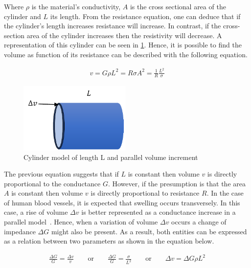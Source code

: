 Where $\rho$ is the material's conductivity, $A$ is the cross sectional area of the cylinder and $L$ its length. From the resistance equation, one can deduce that if the cylinder's length increases resistance will increase. In contrast, if the cross-section area of the cylinder increases then the resistivity will decrease. A representation of this cylinder can be seen in \ref{fig:cylinder model}. Hence, it is possible to find the volume as function of its resistance can be described with the following equation.


\begin{align}
	\label{eq:volume (R)}
	v=G \rho L^2 = R\sigma A^2 = \frac{1}{R} \frac{L^2}{\sigma}
\end{align}

\begin{figure}[!htpb]
	\centering
	\includegraphics[width=5.5cm,keepaspectratio]{figure4}    
	\caption[Cylinder model for impedance calculation]{Cylinder model of length L and parallel volume increment}
	\label{fig:cylinder model}
\end{figure}

The previous equation suggests that if $L$ is constant then volume $v$ is directly proportional to the conductance $G$. However, if the presumption is that the area $A$ is constant then volume $v$ is directly proportional to resistance $R$. In the case of human blood vessels, it is expected that swelling occurs transversely. In this case, a rise of volume $\Delta v$  is better represented as a conductance increase in a parallel model~\cite{martinsen2011bioimpedance}. Hence, when a variation of volume $\Delta v$ occurs a change of impedance $\Delta G$ might also be present. As a result, both entities can be expressed as a relation between two parameters as shown in the equation below.


\begin{align}
	\label{eq:volume (deltav)}
	\frac{\Delta G}{G} = \frac{\Delta v}{v} \qquad\text{or}\qquad \frac{\Delta G}{G} = \frac{\sigma}{L^2} \qquad\text{or}\qquad \Delta v = \Delta G \rho L^2
\end{align}

